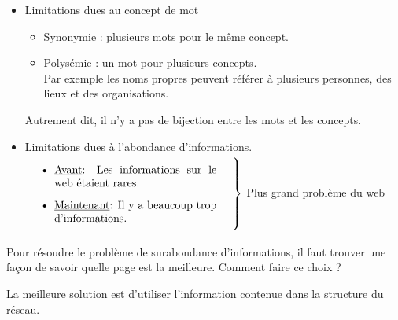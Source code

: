 \begin{itemize}
    \item Limitations dues au concept de mot
        \begin{itemize}
            \item Synonymie : plusieurs mots pour le même concept.
            \item Polysémie : un mot pour plusieurs concepts.\\
            Par exemple les noms propres peuvent référer à plusieurs personnes, des lieux et des organisations.

        \end{itemize}
        
        Autrement dit, il n'y a pas de bijection entre les mots et les concepts.
        
    \item Limitations dues à l'abondance d'informations.\\
    $\left. %
    \parbox{0.5\linewidth}{
        \begin{itemize}
            \item \underline{Avant}: Les informations sur le web étaient rares. 
            \item \underline{Maintenant}: Il y a beaucoup trop d'informations.
        \end{itemize}
        } \hspace{0.5cm} \right 
        \}
        $ Plus grand problème du web
\end{itemize}
    
	Pour résoudre le problème de surabondance d'informations, il faut trouver une façon de savoir quelle page est la meilleure. Comment faire ce choix ?
	
	La meilleure solution est d'utiliser l'information contenue dans la structure du réseau.


%



